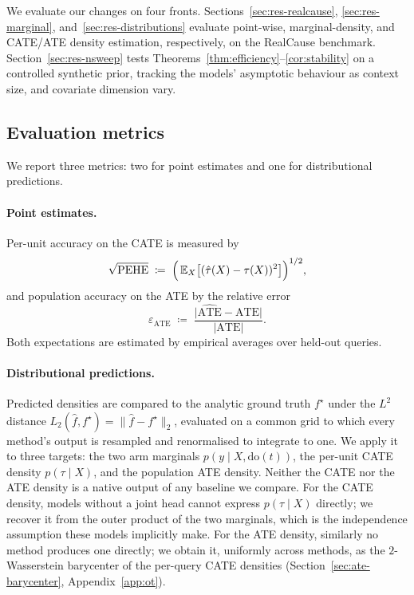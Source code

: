\documentclass[11pt]{article}
\begin{document}
We evaluate our changes on four fronts.
Sections~\ref{sec:res-realcause}, \ref{sec:res-marginal},
and~\ref{sec:res-distributions} evaluate point-wise,
marginal-density, and CATE/ATE density estimation, respectively, on
the RealCause benchmark. Section~\ref{sec:res-nsweep} tests
Theorems~\ref{thm:efficiency}--\ref{cor:stability} on a controlled
synthetic prior, tracking the models' asymptotic behaviour as
context size, and covariate dimension vary.

\subsection{Evaluation metrics}
\label{sec:eval-metrics}

We report three metrics: two for point estimates and one for
distributional predictions.

\paragraph{Point estimates.}
Per-unit accuracy on the CATE is measured by
\begin{equation}
  \sqrt{\mathrm{PEHE}}
  \;\coloneqq\;
  \Bigl(\, \mathbb{E}_{X}\bigl[(\hat{\tau}(X) - \tau(X))^{2}\bigr] \Bigr)^{1/2},
  \label{eq:pehe}
\end{equation}
and population accuracy on the ATE by the relative error
\begin{equation}
  \varepsilon_{\mathrm{ATE}}
  \;\coloneqq\;
  \frac{\bigl|\widehat{\mathrm{ATE}} - \mathrm{ATE}\bigr|}
       {\bigl|\mathrm{ATE}\bigr|}.
  \label{eq:eps-ate}
\end{equation}
Both expectations are estimated by empirical averages over held-out
queries.

\paragraph{Distributional predictions.}
Predicted densities are compared to the analytic ground truth
$f^{\star}$ under the $L^{2}$ distance
$L_{2}(\hat{f}, f^{\star}) = \|\hat{f} - f^{\star}\|_{2}$, evaluated on
a common grid to which every method's output is resampled and
renormalised to integrate to one. We apply it to three targets: the
two arm marginals $p(y \mid X, \mathrm{do}(t))$, the per-unit CATE
density $p(\tau \mid X)$, and the population ATE density. Neither
the CATE nor the ATE density is a native output of any baseline we
compare. For the CATE density, models without a joint head cannot
express $p(\tau \mid X)$ directly; we recover it from the outer
product of the two marginals, which is the independence assumption
these models implicitly make. For the ATE density, similarly no method produces
one directly; we obtain it, uniformly across methods, as the
$2$-Wasserstein barycenter of the per-query CATE densities
(Section~\ref{sec:ate-barycenter}, Appendix~\ref{app:ot}).
\end{document}
